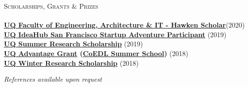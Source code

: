 \documentclass[a4paper]{article}
\newcommand{\lineunder} {
    \vspace*{-8pt} \\
    \hspace*{-10pt} \hrulefill \\
}
\newcommand{\header} [1] {
    {\hspace*{-10pt}\vspace*{6pt} \textsc{#1}}
    \vspace*{-6pt} \lineunder
}
\begin{document}
\header{Scholarships, Grants \& Prizes}
\textbf{\href{https://www.eait.uq.edu.au/eait-scholars-program}{UQ Faculty of Engineering, Architecture \& IT - Hawken Scholar}}\hfill (2020)\\
\textbf{\href{https://ventures.uq.edu.au/san-fran}{UQ IdeaHub San Francisco Startup Adventure Participant}} \hfill (2019)\\
\textbf{\href{https://employability.uq.edu.au/summer-winter-research}{UQ Summer Research Scholarship}} \hfill (2019)\\
\textbf{\href{https://employability.uq.edu.au/financial-support/employability-grant}{UQ Advantage Grant} (\href{http://www.dynamicsoflanguage.edu.au/education-and-outreach/train-with-us/summer-school-2018/}{CoEDL Summer School})} \hfill (2018)\\
\textbf{\href{https://employability.uq.edu.au/summer-winter-research}{UQ Winter Research Scholarship}} \hfill (2018)\\


\vspace{3mm}
\begin{center}
\small \textit{References available upon request}
\end{center}
\end{document}
